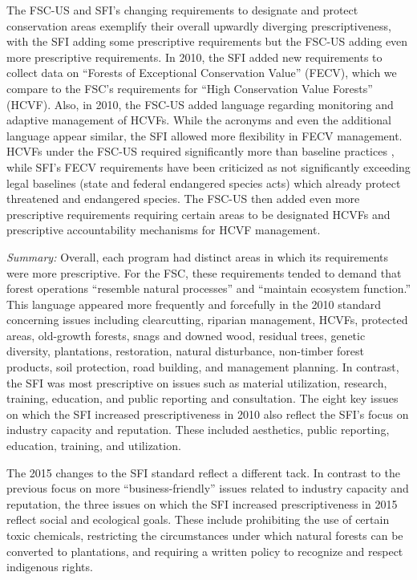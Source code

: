 \documentclass[
      12pt,
            Review ]{article}
\begin{document}
The FSC-US and SFI's changing requirements to designate and protect
conservation areas exemplify their overall upwardly diverging
prescriptiveness, with the SFI adding some prescriptive requirements but
the FSC-US adding even more prescriptive requirements. In 2010, the SFI
added new requirements to collect data on ``Forests of Exceptional
Conservation Value'' (FECV), which we compare to the FSC's requirements
for ``High Conservation Value Forests'' (HCVF). Also, in 2010, the
FSC-US added language regarding monitoring and adaptive management of
HCVFs. While the acronyms and even the additional language appear
similar, the SFI allowed more flexibility in FECV management. HCVFs
under the FSC-US required significantly more than baseline practices
\citep{Newsom2005}, while SFI's FECV requirements have been criticized
as not significantly exceeding legal baselines (state and federal
endangered species acts) which already protect threatened and endangered
species. The FSC-US then added even more prescriptive requirements
requiring certain areas to be designated HCVFs and prescriptive
accountability mechanisms for HCVF management.

\emph{Summary:} Overall, each program had distinct areas in which its
requirements were more prescriptive. For the FSC, these requirements
tended to demand that forest operations ``resemble natural processes''
and ``maintain ecosystem function.'' This language appeared more
frequently and forcefully in the 2010 standard concerning issues
including clearcutting, riparian management, HCVFs, protected areas,
old-growth forests, snags and downed wood, residual trees, genetic
diversity, plantations, restoration, natural disturbance, non-timber
forest products, soil protection, road building, and management
planning. In contrast, the SFI was most prescriptive on issues such as
material utilization, research, training, education, and public
reporting and consultation. The eight key issues on which the SFI
increased prescriptiveness in 2010 also reflect the SFI's focus on
industry capacity and reputation. These included aesthetics, public
reporting, education, training, and utilization.

The 2015 changes to the SFI standard reflect a different tack. In
contrast to the previous focus on more ``business-friendly'' issues
related to industry capacity and reputation, the three issues on which
the SFI increased prescriptiveness in 2015 reflect social and ecological
goals. These include prohibiting the use of certain toxic chemicals,
restricting the circumstances under which natural forests can be
converted to plantations, and requiring a written policy to recognize
and respect indigenous rights.
\end{document}
